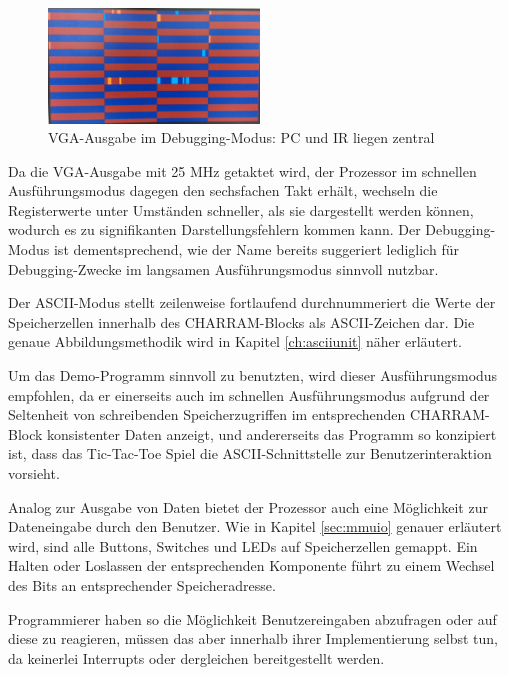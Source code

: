 \begin{figure}[H]
	\centering
	\label{fig:debuggingui}
		\includegraphics[width=0.5\textwidth]{debugui.png}
	\caption[VGA-Ausgabe im Debugging-Modus]{VGA-Ausgabe im Debugging-Modus: PC und IR liegen zentral}
\end{figure}

Da die VGA-Ausgabe mit 25 MHz getaktet wird, der Prozessor im schnellen Ausf\"uhrungsmodus dagegen den sechsfachen Takt erh\"alt, wechseln die Registerwerte unter Umst\"anden schneller, als sie dargestellt werden k\"onnen, wodurch es zu signifikanten Darstellungsfehlern kommen kann. Der Debugging-Modus ist dementsprechend, wie der Name bereits suggeriert lediglich f\"ur Debugging-Zwecke im langsamen Ausf\"uhrungsmodus sinnvoll nutzbar.

Der ASCII-Modus stellt zeilenweise fortlaufend durchnummeriert die Werte der Speicherzellen innerhalb des CHAR\-RAM-Blocks als ASCII-Zeichen dar. Die genaue Abbildungsmethodik wird in Kapitel \ref{ch:asciiunit} n\"aher erl\"autert.

Um das Demo-Programm sinnvoll zu benutzten, wird dieser Ausf\"uhrungsmodus empfohlen, da er einerseits auch im schnellen Ausf\"uhrungsmodus aufgrund der Seltenheit von schreibenden Speicherzugriffen im entsprechenden CHAR\-RAM-Block konsistenter Daten anzeigt, und andererseits das Programm so konzipiert ist, dass das Tic-Tac-Toe Spiel die ASCII-Schnittstelle zur Benutzerinteraktion vorsieht.


Analog zur Ausgabe von Daten bietet der Prozessor auch eine M\"oglichkeit zur Dateneingabe durch den Benutzer. Wie in Kapitel \ref{sec:mmuio} genauer erl\"autert wird, sind alle Buttons, Switches und LEDs auf Speicherzellen gemappt. Ein Halten oder Loslassen der entsprechenden Komponente f\"uhrt zu einem Wechsel des Bits an entsprechender Speicheradresse.

Programmierer haben so die M\"oglichkeit Benutzereingaben abzufragen oder auf diese zu reagieren, m\"ussen das aber innerhalb ihrer Implementierung selbst tun, da keinerlei Interrupts oder dergleichen bereitgestellt werden.

\newpage

